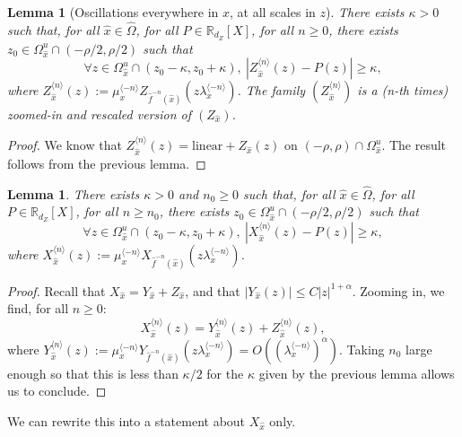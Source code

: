 \documentclass[a4paper]{article}
\newtheorem{lemma}[theorem]{Lemma}
\theoremstyle{definition}
\begin{document}
\begin{lemma}[Oscillations everywhere in $x$, at all scales in $z$]
There exists $\kappa>0$ such that, for all ${\widehat{x}} \in \widehat{\Omega}$, for all $P \in \mathbb{R}_{d_Z}[X]$, for all $n \geq 0$, there exists $z_0 \in \Omega_{\widehat{x}}^u \cap (-\rho/2,\rho/2)$ such that
$$ \forall z \in \Omega_{\widehat{x}}^u \cap (z_0 - \kappa, z_0 + \kappa), \  |Z_{\widehat{x}}^{\langle n \rangle}(z) - P(z)| \geq \kappa ,$$
where $Z_{\widehat{x}}^{\langle n \rangle}(z) := \mu_x^{\langle -n \rangle} Z_{\widehat{f}^{-n}({\widehat{x}})}( z \lambda_x^{\langle -n \rangle})$. The family $(Z_{\widehat{x}}^{\langle n \rangle})$ is a (n-th times) zoomed-in and rescaled version of $(Z_{\widehat{x}})$.
\end{lemma}
\begin{proof}
We know that $Z_{\widehat{x}}^{\langle n \rangle}(z) = \text{linear} + Z_{\widehat{x}}(z)$ on $(-\rho,\rho) \cap \Omega_{\widehat{x}}^u$. The result follows from the previous lemma.
\end{proof}


\begin{lemma}
There exists $\kappa>0$ and $n_0 \geq 0$ such that, for all $\widehat{x} \in \widehat{\Omega}$, for all $P \in \mathbb{R}_{d_Z}[X]$, for all $n \geq n_0$, there exists $z_0 \in \Omega_{{\widehat{x}}}^u \cap (-\rho/2,\rho/2)$ such that
$$\forall z \in \Omega_{\widehat{x}}^u \cap (z_0 - \kappa, z_0 + \kappa), \  |X_{\widehat{x}}^{\langle n \rangle}(z) - P(z)| \geq \kappa ,$$
where $X_{\widehat{x}}^{\langle n \rangle}(z) := \mu_x^{\langle -n \rangle} X_{\widehat{f}^{-n}({\widehat{x}})}( z \lambda_x^{\langle -n \rangle})$. 
\end{lemma}
\begin{proof}
Recall that $X_{\widehat{x}} = Y_{\widehat{x}} + Z_{\widehat{x}}$, and that $|Y_{\widehat{x}}(z)| \leq C|z|^{1+\alpha}$. Zooming in, we find, for all $n \geq 0$:
$$ X_{\widehat{x}}^{\langle n \rangle}(z) = Y_{\widehat{x}}^{\langle n \rangle}(z) + Z_{\widehat{x}}^{\langle n \rangle}(z) ,$$
where $Y_{\widehat{x}}^{\langle n \rangle}(z) := \mu_x^{\langle -n \rangle} Y_{\widehat{f}^{-n}({\widehat{x}})}(z \lambda_x^{\langle -n \rangle}) = O( (\lambda_x^{\langle - n \rangle})^\alpha ).$ Taking $n_0$ large enough so that this is less than $\kappa/2$ for the $\kappa$ given by the previous lemma allows us to conclude.
\end{proof}

We can rewrite this into a statement about $X_{\widehat{x}}$ only.
\end{document}
